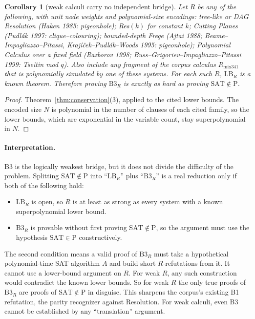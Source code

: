 \documentclass[11pt]{article}
\newtheorem{corollary}[theorem]{Corollary}
\theoremstyle{definition}
\begin{document}
\begin{corollary}[weak calculi carry no independent bridge]\label{cor:weak}
Let $R$ be any of the following, with unit node weights and polynomial-size encodings:
tree-like or DAG Resolution (Haken 1985: pigeonhole);
Res$(k)$ for constant $k$;
Cutting Planes (Pudlák 1997: clique--colouring);
bounded-depth Frege (Ajtai 1988; Beame--Impagliazzo--Pitassi, Krajíček--Pudlák--Woods 1995: pigeonhole);
Polynomial Calculus over a fixed field (Razborov 1998; Buss--Grigoriev--Impagliazzo--Pitassi 1999: Tseitin mod $q$).
Also include any fragment of the corpus calculus $R_{\mathrm{mix341}}$ that is polynomially simulated by one of these systems.
For each such $R$, $\mathrm{LB}_R$ is a known theorem.
Therefore proving $\mathrm{B3}_R$ is \emph{exactly as hard as proving} $\mathrm{SAT}\notin\mathrm{P}$.
\end{corollary}
\begin{proof}
Theorem~\ref{thm:conservation}(3), applied to the cited lower bounds.
The encoded size $N$ is polynomial in the number of clauses of each cited family, so the lower bounds, which are exponential in the variable count, stay superpolynomial in $N$.
\end{proof}

\paragraph{Interpretation.}
B3 is the logically weakest bridge, but it does not divide the difficulty of the problem.
Splitting $\mathrm{SAT}\notin\mathrm{P}$ into ``$\mathrm{LB}_R$'' plus ``$\mathrm{B3}_R$'' is a real reduction only if both of the following hold:
\begin{itemize}
\item $\mathrm{LB}_R$ is open, so $R$ is at least as strong as every system with a known superpolynomial lower bound.
\item $\mathrm{B3}_R$ is provable without first proving $\mathrm{SAT}\notin\mathrm{P}$, so the argument must use the hypothesis $\mathrm{SAT}\in\mathrm{P}$ constructively.
\end{itemize}
The second condition means a valid proof of $\mathrm{B3}_R$ must take a hypothetical polynomial-time SAT algorithm $A$ and build short $R$-refutations from it.
It cannot use a lower-bound argument on $R$.
For weak $R$, any such construction would contradict the known lower bounds.
So for weak $R$ the only true proofs of $\mathrm{B3}_R$ are proofs of $\mathrm{SAT}\notin\mathrm{P}$ in disguise.
This sharpens the corpus's existing B1 refutation, the parity recognizer against Resolution.
For weak calculi, even B3 cannot be established by any ``translation'' argument.
\end{document}
